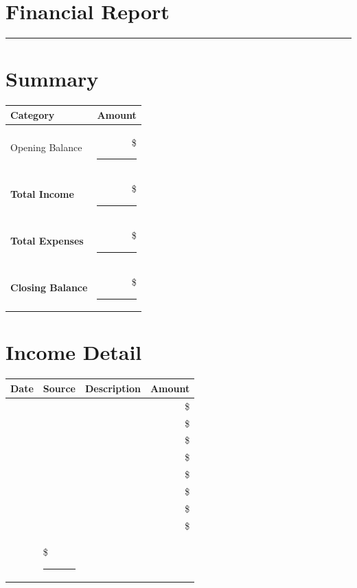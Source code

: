 \documentclass[11pt, letterpaper]{article}
\begin{document}

\section*{Financial Report}

\vspace{0.5em}
{\color{afp-teal}\rule{\textwidth}{0.5pt}}
\vspace{1em}


\section{Summary}

\begin{center}
\begin{tabularx}{\textwidth}{|X|r|}
\hline
\rowcolor{afp-teal!10}
\textbf{Category} & \textbf{Amount} \\
\hline
Opening Balance & \$ \rule{3cm}{0.4pt} \\[0.5em]
\hline
\textbf{Total Income} & \$ \rule{3cm}{0.4pt} \\[0.5em]
\hline
\textbf{Total Expenses} & \$ \rule{3cm}{0.4pt} \\[0.5em]
\hline
\rowcolor{afp-teal!5}
\textbf{Closing Balance} & \$ \rule{3cm}{0.4pt} \\[0.5em]
\hline
\end{tabularx}
\end{center}

\section{Income Detail}

\begin{center}
\begin{tabularx}{\textwidth}{|c|X|X|r|}
\hline
\rowcolor{afp-teal!10}
\textbf{Date} & \textbf{Source} & \textbf{Description} & \textbf{Amount} \\
\hline
 & & & \$ \\[0.7cm] \hline
 & & & \$ \\[0.7cm] \hline
 & & & \$ \\[0.7cm] \hline
 & & & \$ \\[0.7cm] \hline
 & & & \$ \\[0.7cm] \hline
 & & & \$ \\[0.7cm] \hline
 & & & \$ \\[0.7cm] \hline
 & & & \$ \\[0.7cm] \hline
\hline
\rowcolor{afp-teal!5}
\multicolumn{3}{|r|}{\textbf{Total Income}} & \$ \rule{2cm}{0.4pt} \\[0.4cm]
\hline
\end{tabularx}
\end{center}
\end{document}
